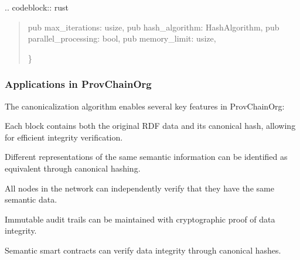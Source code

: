 \documentclass[letterpaper,10pt,english]{sphinxmanual}
\begin{document}
\sphinxAtStartPar
{}
.. code\sphinxhyphen{}block:: rust
\begin{quote}
\begin{description}
\sphinxAtStartPar
pub max\_iterations: usize,
pub hash\_algorithm: HashAlgorithm,
pub parallel\_processing: bool,
pub memory\_limit: usize,

\end{description}

\sphinxAtStartPar
\}
\end{quote}


\subsubsection{Applications in ProvChainOrg}
\label{\detokenize{research/rdf-canonicalization-algorithm:applications-in-provchainorg}}
\sphinxAtStartPar
The canonicalization algorithm enables several key features in ProvChainOrg:
\begin{description}
\sphinxAtStartPar
Each block contains both the original RDF data and its canonical hash, allowing for efficient integrity verification.

\sphinxAtStartPar
Different representations of the same semantic information can be identified as equivalent through canonical hashing.

\sphinxAtStartPar
All nodes in the network can independently verify that they have the same semantic data.

\sphinxAtStartPar
Immutable audit trails can be maintained with cryptographic proof of data integrity.

\sphinxAtStartPar
Semantic smart contracts can verify data integrity through canonical hashes.

\end{description}
\end{document}
